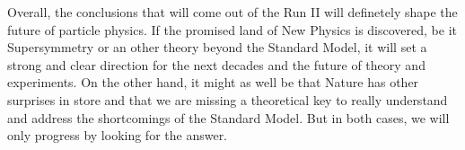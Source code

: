 Overall, the conclusions that will come out of the Run II will definetely shape the future
of particle physics. If the promised land of New Physics is discovered, be it Supersymmetry
or an other theory beyond the Standard Model, it will set a strong and clear direction
for the next decades and the future of theory and experiments. On the other hand, it might
as well be that Nature has other surprises in store and that we are missing a theoretical
key to really understand and address the shortcomings of the Standard Model. But in both
cases, we will only progress by looking for the answer.






